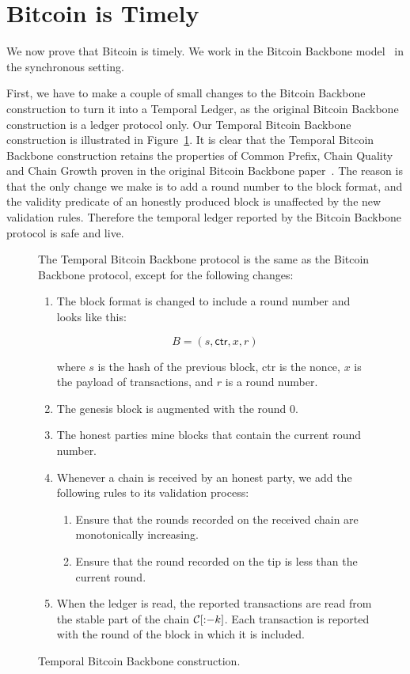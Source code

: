 \section{Bitcoin is Timely}

We now prove that Bitcoin is timely. We work in the Bitcoin Backbone model~\cite{backbone}
in the synchronous setting.

First, we have to make a couple of small changes to the Bitcoin Backbone construction to turn it
into a Temporal Ledger, as the original Bitcoin Backbone construction is a ledger protocol only.
Our Temporal Bitcoin Backbone construction is illustrated in Figure~\ref{fig.temporal-backbone}.
It is clear that the Temporal Bitcoin Backbone construction retains the properties of Common Prefix,
Chain Quality and Chain Growth proven in the original Bitcoin Backbone paper~\cite{backbone}.
The reason is that the only change we make is to add a round number to the block format, and
the validity predicate of an honestly produced block is unaffected by the new validation rules.
Therefore the temporal ledger reported by the Bitcoin Backbone protocol is safe and live.

\begin{figure}

  The Temporal Bitcoin Backbone protocol is the same as the Bitcoin Backbone protocol, except
  for the following changes:

  \begin{enumerate}
    \item The block format is changed to include a round number and looks like this:

    \[
      B = (s, \textsf{ctr}, x, r)
    \]

    where $s$ is the hash of the previous block, \textsf{ctr} is the nonce, $x$ is the
    payload of transactions, and $r$ is a round number.

    \item The genesis block is augmented with the round $0$.
    \item The honest parties mine blocks that contain the current round number.
    \item Whenever a chain is received by an honest party, we add the following rules to
          its validation process:

          \begin{enumerate}
            \item Ensure that the rounds recorded on the received chain are monotonically
                  increasing.
            \item Ensure that the round recorded on the tip is less than the current round.
          \end{enumerate}
    \item When the ledger is \textsf{read}, the reported transactions are read from the
          stable part of the chain $\mathcal{C}[{:}{-k}]$. Each transaction is reported with the
          round of the block in which it is included.
  \end{enumerate}
  \caption{Temporal Bitcoin Backbone construction.}
  \label{fig.temporal-backbone}
\end{figure}

